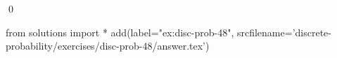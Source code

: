 
\begin{ex} 
  \label{ex:disc-prob-48}
  
  \qed
\end{ex} 
\begin{python0}
from solutions import *
add(label="ex:disc-prob-48",
    srcfilename='discrete-probability/exercises/disc-prob-48/answer.tex') 
\end{python0}
